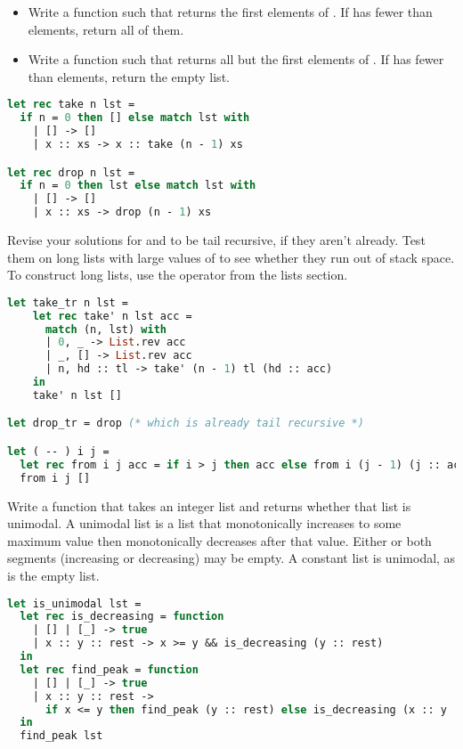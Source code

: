 \begin{itemize}
	\item Write a function  such that  returns the first  elements of . If  has fewer than  elements, return all of them.
	\item Write a function  such that  returns all but the first  elements of . If  has fewer than  elements, return the empty list.
\end{itemize}

\begin{lstlisting}[language=OCaml]
let rec take n lst =
  if n = 0 then [] else match lst with
    | [] -> []
    | x :: xs -> x :: take (n - 1) xs

let rec drop n lst =
  if n = 0 then lst else match lst with
    | [] -> []
    | x :: xs -> drop (n - 1) xs
\end{lstlisting}

Revise your solutions for  and  to be tail recursive, if they aren't already. Test them on long lists with large
values of  to see whether they run out of stack space. To construct long lists, use the \code{-{-}} operator from the lists section.

\begin{lstlisting}[language=OCaml]
let take_tr n lst =
	let rec take' n lst acc =
	  match (n, lst) with
	  | 0, _ -> List.rev acc
	  | _, [] -> List.rev acc
	  | n, hd :: tl -> take' (n - 1) tl (hd :: acc)
	in
	take' n lst []

let drop_tr = drop (* which is already tail recursive *)

let ( -- ) i j =
  let rec from i j acc = if i > j then acc else from i (j - 1) (j :: acc) in
  from i j []
\end{lstlisting}

\problem[unimodal]
Write a function  that takes an integer list and returns whether that list is unimodal. A unimodal list is a list that monotonically increases to some maximum value then monotonically decreases after that value. Either or both segments (increasing or decreasing) may be empty. A constant list is unimodal, as is the empty list.

\begin{lstlisting}[language=Caml]
let is_unimodal lst =
  let rec is_decreasing = function
    | [] | [_] -> true
    | x :: y :: rest -> x >= y && is_decreasing (y :: rest)
  in
  let rec find_peak = function
    | [] | [_] -> true
    | x :: y :: rest ->
      if x <= y then find_peak (y :: rest) else is_decreasing (x :: y :: rest)
  in
  find_peak lst
\end{lstlisting}

